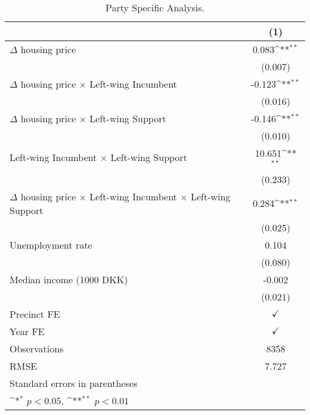 \begin{table}[htbp]\centering
\def\sym#1{\ifmmode^{#1}\else\(^{#1}\)\fi}
\caption{Party Specific Analysis.} \label{partyspecifictab}
\begin{tabular}{l*{1}{c}}
\hline\hline
                    &\multicolumn{1}{c}{(1)}        \\
\hline
$\Delta$ housing price&       0.083\sym{**}\\
                    &     (0.007)        \\
[1em]
$\Delta$ housing price $\times$ Left-wing Incumbent&      -0.123\sym{**}\\
                    &     (0.016)        \\
[1em]
$\Delta$ housing price $\times$ Left-wing Support&      -0.146\sym{**}\\
                    &     (0.010)        \\
[1em]
Left-wing Incumbent $\times$ Left-wing Support&      10.651\sym{**}\\
                    &     (0.233)        \\
[1em]
$\Delta$ housing price $\times$ Left-wing Incumbent $\times$ Left-wing Support&       0.284\sym{**}\\
                    &     (0.025)        \\
[1em]
Unemployment rate   &       0.104        \\
                    &     (0.080)        \\
[1em]
Median income (1000 DKK)&      -0.002        \\
                    &     (0.021)        \\
[1em]
\hline Precinct FE  &$\checkmark$        \\
[1em]
Year FE             &$\checkmark$        \\
\hline
Observations        &        8358        \\
RMSE                &       7.727        \\
\hline\hline
\multicolumn{2}{l}{\footnotesize Standard errors in parentheses}\\
\multicolumn{2}{l}{\footnotesize \sym{*} \(p<0.05\), \sym{**} \(p<0.01\)}\\
\end{tabular}
\end{table}
